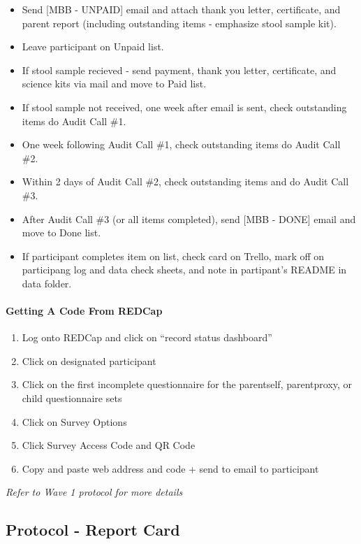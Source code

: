 \documentclass[]{book}
\let\oldparagraph\paragraph
\renewcommand{\paragraph}[1]{\oldparagraph{#1}\mbox{}}
\begin{document}
\begin{itemize}
\item
  Send {[}MBB - UNPAID{]} email and attach thank you letter, certificate, and parent report (including outstanding items - emphasize stool sample kit).
\item
  Leave participant on Unpaid list.
\item
  If stool sample recieved - send payment, thank you letter, certificate, and science kits via mail and move to Paid list.
\item
  If stool sample not received, one week after email is sent, check outstanding items do Audit Call \#1.
\item
  One week following Audit Call \#1, check outstanding items do Audit Call \#2.
\item
  Within 2 days of Audit Call \#2, check outstanding items and do Audit Call \#3.
\item
  After Audit Call \#3 (or all items completed), send {[}MBB - DONE{]} email and move to Done list.
\item
  If participant completes item on list, check card on Trello, mark off on participang log and data check sheets, and note in partipant's README in data folder.
\end{itemize}

\hypertarget{getting-a-code-from-redcap-1}{%
\paragraph{Getting A Code From REDCap}\label{getting-a-code-from-redcap-1}}

\begin{enumerate}
\def\labelenumi{\arabic{enumi}.}
\item
  Log onto REDCap and click on ``record status dashboard''
\item
  Click on designated participant
\item
  Click on the first incomplete questionnaire for the parentself, parentproxy, or child questionnaire sets
\item
  Click on Survey Options
\item
  Click Survey Access Code and QR Code
\item
  Copy and paste web address and code + send to email to participant
\end{enumerate}

\emph{Refer to Wave 1 protocol for more details}

\hypertarget{protocol---report-card-1}{%
\subsection{Protocol - Report Card}\label{protocol---report-card-1}}
\end{document}
